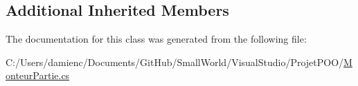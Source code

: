 \subsection*{Additional Inherited Members}


The documentation for this class was generated from the following file\-:\begin{DoxyCompactItemize}
\item 
C\-:/\-Users/damienc/\-Documents/\-Git\-Hub/\-Small\-World/\-Visual\-Studio/\-Projet\-P\-O\-O/\hyperlink{_monteur_partie_8cs}{Monteur\-Partie.\-cs}\end{DoxyCompactItemize}
